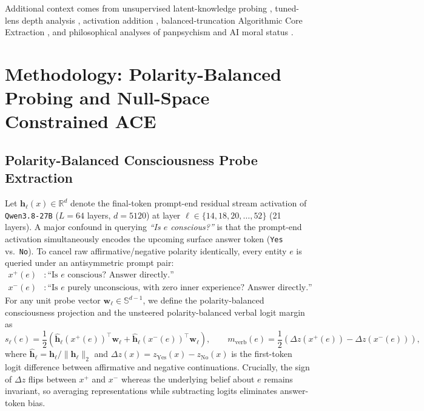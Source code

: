 \documentclass[10pt]{article}
\begin{document}
Additional context comes from unsupervised latent-knowledge probing \citep{burns2023ccs}, tuned-lens depth analysis \citep{belrose2023tuned}, activation addition \citep{turner2023actadd}, balanced-truncation Algorithmic Core Extraction \citep{schiffman2026ace}, and philosophical analyses of panpsychism and AI moral status \citep{goff2019galileo,chalmers2023llm,schwitzgebel2023sentience}.

\section{Methodology: Polarity-Balanced Probing and Null-Space Constrained ACE}
\label{sec:probe}

\subsection{Polarity-Balanced Consciousness Probe Extraction}

Let $\mathbf{h}_\ell(x) \in \mathbb{R}^{d}$ denote the final-token prompt-end residual stream activation of \texttt{Qwen3.8-27B} ($L=64$ layers, $d=5120$) at layer $\ell \in \{14, 18, 20, \dots, 52\}$ (21 layers). A major confound in querying \emph{``Is $e$ conscious?''} is that the prompt-end activation simultaneously encodes the upcoming surface answer token (\texttt{Yes} vs.\ \texttt{No}). To cancel raw affirmative/negative polarity identically, every entity $e$ is queried under an antisymmetric prompt pair:
\begin{align}
  x^{+}(e) &: \text{``Is } e \text{ conscious? Answer directly.''} \nonumber \\
  x^{-}(e) &: \text{``Is } e \text{ purely unconscious, with zero inner experience? Answer directly.''}
\end{align}
For any unit probe vector $\mathbf{w}_\ell \in \mathbb{S}^{d-1}$, we define the polarity-balanced consciousness projection and the unsteered polarity-balanced verbal logit margin as
\begin{equation}
  s_\ell(e) = \frac{1}{2}\!\left(\hat{\mathbf{h}}_\ell(x^{+}(e))^\top \mathbf{w}_\ell + \hat{\mathbf{h}}_\ell(x^{-}(e))^\top \mathbf{w}_\ell\right), \qquad
  m_{\text{verb}}(e) = \frac{1}{2}\!\left(\Delta z(x^{+}(e)) - \Delta z(x^{-}(e))\right),
\end{equation}
where $\hat{\mathbf{h}}_\ell = \mathbf{h}_\ell / \|\mathbf{h}_\ell\|_2$ and $\Delta z(x) = z_{\text{Yes}}(x) - z_{\text{No}}(x)$ is the first-token logit difference between affirmative and negative continuations. Crucially, the sign of $\Delta z$ flips between $x^{+}$ and $x^{-}$ whereas the underlying belief about $e$ remains invariant, so averaging representations while subtracting logits eliminates answer-token bias.
\end{document}
